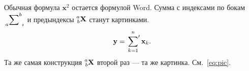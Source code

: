 \documentclass[12pt]{article}
\newcommand{\myvec}[1]{\mathbf{#1}}
\begin{document}
Обычная формула $\myvec{x}^2$ остается формулой Word.
Сумма с индексами по бокам $\sideset{_a}{^b}\sum_{i}$ и
предындексы $\prescript{a}{b}{\myvec{X}}$ станут картинками.
\begin{equation}\label{eq:pic}
  \smash{\myvec{y}} = \sideset{}{'}\sum_{k=1}^{n} \myvec{x}_k .
\end{equation}
Та же самая конструкция $\prescript{a}{b}{\myvec{X}}$ второй раз — та же картинка.
См.~\eqref{eq:pic}.
\end{document}
